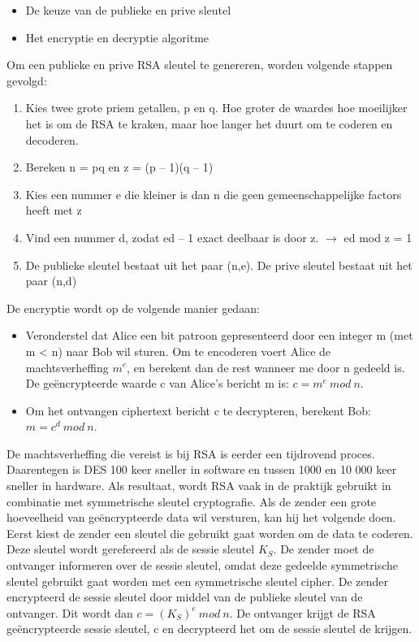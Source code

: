 \begin{itemize}
\item De keuze van de publieke en prive sleutel
\item Het encryptie en decryptie algoritme
\end{itemize}
Om een publieke en prive RSA sleutel te genereren, worden volgende stappen gevolgd:

\begin{enumerate}
\item Kies twee grote priem getallen, p en q. Hoe groter de waardes hoe moeilijker het is om de RSA te kraken, maar hoe langer het duurt om te coderen en decoderen.
\item Bereken n = pq en z = (p – 1)(q – 1)
\item Kies een nummer e die kleiner is dan n die geen gemeenschappelijke factors heeft met z
\item Vind een nummer d, zodat ed – 1 exact deelbaar is door z. $\rightarrow$ ed mod z = 1
\item De publieke sleutel bestaat uit het paar (n,e). De prive sleutel bestaat uit het paar (n,d)
\end{enumerate}
De encryptie wordt op de volgende manier gedaan:

\begin{itemize}
\item Veronderstel dat Alice een bit patroon gepresenteerd door een integer m (met m < n) naar Bob wil sturen. Om te encoderen voert Alice de machtsverheffing $m^e$, en berekent dan de rest wanneer me door n gedeeld is. De geëncrypteerde waarde c van Alice’s bericht m is: $c = m^e\ mod\ n$.
\item Om het ontvangen ciphertext bericht c te decrypteren, berekent Bob: $m = c^d\ mod\ n$.
\end{itemize}


De machtsverheffing die vereist is bij RSA is eerder een tijdrovend proces. Daarentegen is DES 100 keer sneller in software en tussen 1000 en 10 000 keer sneller in hardware. Als resultaat, wordt RSA vaak in de praktijk gebruikt in combinatie met symmetrische sleutel cryptografie.
Als de zender een grote hoeveelheid van geëncrypteerde data wil versturen, kan hij het volgende doen. Eerst kiest de zender een sleutel die gebruikt gaat worden om de data te coderen. Deze sleutel wordt gerefereerd als de sessie sleutel $K_S$. De zender moet de ontvanger informeren over de sessie sleutel, omdat deze gedeelde symmetrische sleutel gebruikt gaat worden met een symmetrische sleutel cipher. De zender encrypteerd de sessie sleutel door middel van de publieke sleutel van de ontvanger. Dit wordt dan $c = (K_S)^e\ mod\ n$. De ontvanger krijgt de RSA geëncrypteerde sessie sleutel, c en decrypteerd het om de sessie sleutel de krijgen.

